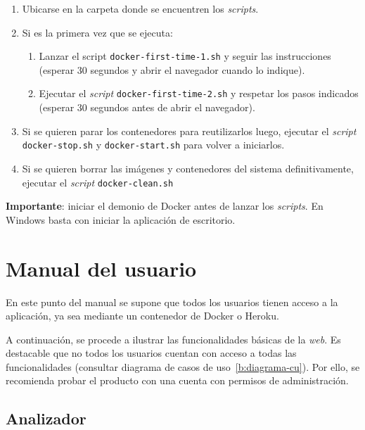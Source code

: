 \begin{enumerate}
	\item Ubicarse en la carpeta donde se encuentren los \textit{scripts}.
	\item Si es la primera vez que se ejecuta:
	\begin{enumerate}
	\item Lanzar el script \texttt{docker-first-time-1.sh} y seguir las instrucciones (esperar 30 segundos y abrir el navegador cuando lo indique).
	\item Ejecutar el \textit{script} \texttt{docker-first-time-2.sh} y respetar los pasos indicados (esperar 30 segundos antes de abrir el navegador).
	\end{enumerate}
	\item Si se quieren parar los contenedores para reutilizarlos luego, ejecutar el \textit{script} \texttt{docker-stop.sh} y \texttt{docker-start.sh} para volver a iniciarlos.
	\item Si se quieren borrar las imágenes y contenedores del sistema definitivamente, ejecutar el \textit{script} \texttt{docker-clean.sh}
\end{enumerate}

\textbf{Importante}: iniciar el demonio de Docker antes de lanzar los \textit{scripts}. En Windows basta con iniciar la aplicación de escritorio.

\section{Manual del usuario}

En este punto del manual se supone que todos los usuarios tienen acceso a la aplicación, ya sea mediante un contenedor de Docker o Heroku.

A continuación, se procede a ilustrar las funcionalidades básicas de la \textit{web}. Es destacable que no todos los usuarios cuentan con acceso a todas las funcionalidades (consultar diagrama de casos de uso~\ref{b:diagrama-cu}). Por ello, se recomienda probar el producto con una cuenta con permisos de administración.

\subsection{Analizador}

